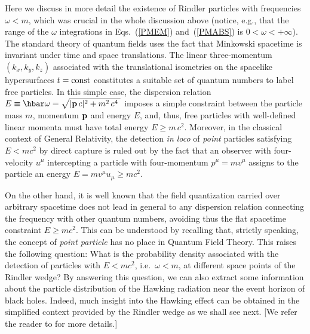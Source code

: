\documentclass[12pt,nofootinbib,floatfix,aps,prd,showpacs,amsmath,amssymb,eqsecnum]{revtex4-2}
\begin{document}
Here we discuss in more detail the existence of Rindler particles with
frequencies $\omega <m $, which was crucial in the whole 
discussion above
(notice, e.g., that the range of the $\omega$ integrations in 
Eqs.~(\ref{PMEM}) and~(\ref{PMABS}) is $0<\omega< + \infty $).
The standard theory of quantum fields uses the fact that Minkowski
spacetime is 
invariant under time and space translations.
The linear three-momentum 
$(k_x,k_y,k_z)$ associated with the translational isometries on the 
spacelike hypersurfaces $t= {\rm const}$ constitutes a suitable set of quantum
numbers to label free particles.  In this simple case, the dispersion
relation $E \equiv \hbar \omega = \sqrt{| {\bf p} \, c |^2 + m^2 \, c^4 \;}$
imposes a simple constraint between the particle mass $m$, momentum ${\bf p}$
and energy $E$, and, thus, free particles with well-defined linear momenta must
have total energy $E \ge m\, c^2$. Moreover, 
in the classical context of General 
Relativity, the detection {\em in loco} of {\em point} particles satisfying 
$ E < m c^2 $ by direct capture is ruled out by the fact that an 
observer with 
four-velocity $u^\mu$ intercepting a particle with four-momentum 
$p^\mu = m v^\mu$ assigns to the particle an energy
$E = m v^\mu u_\mu \ge mc^2$. 

On the other hand, it is well known that the field quantization 
carried over arbitrary spacetime does not lead in general to 
any dispersion  relation connecting the frequency with other 
quantum numbers, avoiding thus the flat spacetime constraint 
$E \ge mc^2$. This can be understood by recalling that, strictly
speaking, the concept of 
{\em point particle} has no place in Quantum Field Theory. 
This raises the following question: What is the probability 
density associated with the detection of particles with $E < m c^2$, 
i.e.~$\omega < m$, at different space points of the Rindler wedge?
By answering this question, we can also extract some information
about the particle distribution of the Hawking radiation near
the event horizon of black holes. Indeed, much insight into the 
Hawking effect can be obtained in the simplified context provided 
by the Rindler wedge as we shall see next. [We refer the reader to 
\textcite{Castineirasetal02} for more details.]
\end{document}
